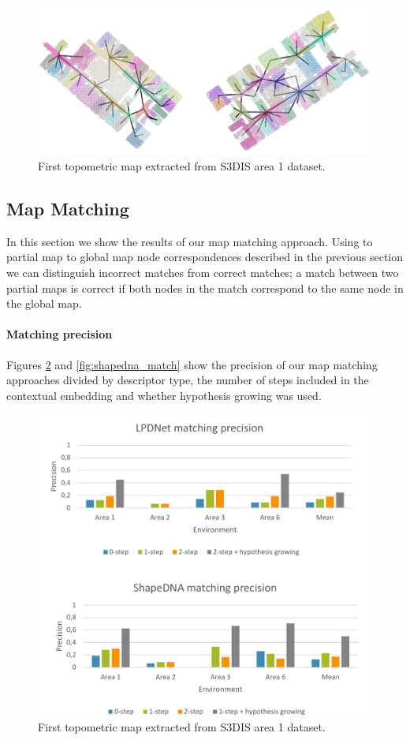 \begin{figure}[h]
    \centering
    \includegraphics*[width=\textwidth]{./fig/area_1_topo.pdf}
    \caption{First topometric map extracted from S3DIS area 1 dataset.}
    \label{fig:area_1_topo_01}
\end{figure}

\subsection{Map Matching}
In this section we show the results of our map matching approach. Using to partial map to global map node correspondences described in the previous section we can distinguish incorrect matches from correct matches; a match between two partial maps is correct if both nodes in the match correspond to the same node in the global map. 

\paragraph{Matching precision}
Figures \ref{fig:lpdnet_match} and \ref{fig:shapedna_match} show the precision of our map matching approaches divided by descriptor type, the number of steps included in the contextual embedding and whether hypothesis growing was used. 

\begin{figure}[h]
    \centering
    \includegraphics*[width=\textwidth]{./fig/match_charts.pdf}
    \caption{First topometric map extracted from S3DIS area 1 dataset.}
    \label{fig:lpdnet_match}
\end{figure}


